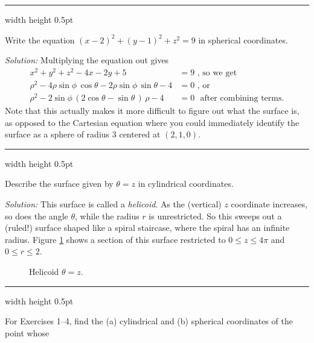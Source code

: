 \vspace{2mm}
\hrule width \textwidth height 0.5pt
\begin{exmp}
 Write the equation $(x - 2)^2 + (y - 1)^2 + z^2 = 9$ in spherical coordinates.\vspace{1mm}
 \par\noindent \emph{Solution:} Multiplying the equation out gives
 \begin{align*}
  x^2 + y^2 + z^2 - 4x - 2y + 5 &= 9 \text{~, so we get}\\
  \rho^2 - 4 \rho \sin \phi \,\cos \theta - 2 \rho \sin \phi \,\sin \theta - 4 &= 0 \text{~,~or}\\
  \rho^2 - 2 \sin \phi \, ( 2 \cos \theta - \sin \theta \, ) \,\rho - 4 &= 0\text{~~after combining terms.}
 \end{align*}
 Note that this actually makes it more difficult to figure out what the surface is,
 as opposed to the Cartesian equation where you could immediately identify the surface as a sphere of radius $3$ centered
 at $(2,1,0)$.
\end{exmp}
\hrule width \textwidth height 0.5pt
\begin{exmp}\label{exmp:helicoid}
 Describe the surface given by $\theta = z$ in cylindrical coordinates.\vspace{1mm}
 \par\noindent \emph{Solution:} This surface is called a \emph{helicoid}. 
 As the (vertical) $z$
 coordinate increases, so does the angle $\theta$, while the radius $r$ is unrestricted. 
 So this sweeps out a (ruled!)
 surface shaped like a spiral staircase, where the spiral has an infinite radius. 
 Figure \ref{fig:helicoid} shows a
 section of this surface restricted to $0 \le z \le 4\pi$ and $0 \le r \le 2$.
 \vspace{-25mm}
 \begin{figure}[h]
  \begin{center}
   
  \end{center}\vspace{-18mm}
 \caption[]{\quad Helicoid $\theta = z$.}
 \label{fig:helicoid}
 \end{figure}
\end{exmp}
\newpage
\vspace{-4mm}
\hrule width \textwidth height 0.5pt
\centerline{}\label{sec1dot7}
\par\noindent For Exercises 1--4, find the (a) cylindrical and (b) spherical coordinates of the point whose
